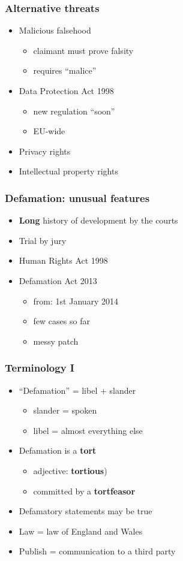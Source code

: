 \documentclass[ignorenonframetext,]{beamer}
\begin{document}
\begin{frame}
  \frametitle{Alternative threats}
  \begin{itemize}
  \item Malicious falsehood
    \begin{itemize}
    \item claimant must prove falsity
    \item requires ``malice''
    \end{itemize}
  \item Data Protection Act 1998
    \begin{itemize}
    \item new regulation ``soon''
    \item EU-wide
    \end{itemize}
  \item Privacy rights
  \item Intellectual property rights
  \end{itemize}
\end{frame}

\begin{frame}
  \frametitle{Defamation: unusual features}
  \begin{itemize}
  \item {\bf Long} history of development by the courts
  \item Trial by jury
  \item Human Rights Act 1998
  \item Defamation Act 2013
    \begin{itemize}
    \item from: 1st January 2014
    \item few cases so far
    \item messy patch
    \end{itemize}
  \end{itemize}
\end{frame}

\begin{frame}
\frametitle{Terminology I}

\begin{itemize}
\item ``Defamation'' = libel + slander
  \begin{itemize}
  \item slander = spoken
  \item libel = almost everything else
  \end{itemize}
  \item Defamation is a {\bf tort}
    \begin{itemize}
    \item adjective: {\bf tortious})
    \item committed by a {\bf tortfeasor}
    \end{itemize}
\item Defamatory statements may be true
\item Law = law of England and Wales
\item Publish = communication to a third party
\end{itemize}
\end{frame}
\end{document}
